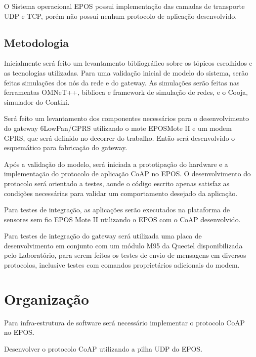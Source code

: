 O Sistema operacional EPOS possui implementa\c{c}\~ao das camadas de transporte UDP e TCP, por\'em n\~ao possui nenhum protocolo de aplica\c{c}\~ao desenvolvido.

\subsection{Metodologia}

Inicialmente ser\'a feito um levantamento bibliogr\'afico sobre os t\'opicos escolhidos e as tecnologias utilizadas. Para uma valida\c{c}\~ao inicial de modelo do sistema, ser\~ao feitas simula\c{c}\~oes dos n\'os da rede e do gateway. As simula\c{c}\~oes ser\~ao feitas nas ferramentas OMNeT++, biblioca e framework de simula\c{c}\~ao de redes, e o Cooja, simulador do Contiki.

Ser\'a feito um levantamento dos componentes necess\'arios para o desenvolvimento do gateway 6LowPan/GPRS utilizando o mote EPOSMote II e um modem GPRS, que ser\'a definido no decorrer do trabalho. Ent\~ao ser\'a desenvolvido o esquem\'atico para fabrica\c{c}\~ao do gateway.

Ap\'os a valida\c{c}\~ao do modelo, ser\'a iniciada a prototipa\c{c}\~ao do hardware e a implementa\c{c}\~ao do protocolo de aplica\c{c}\~ao CoAP no EPOS. O desenvolvimento do protocolo ser\'a orientado a testes, aonde o c\'odigo escrito apenas satisfaz as condi\c{c}\~oes necess\'arias para validar um comportamento desejado da aplica\c{c}\~ao.

Para testes de integra\c{c}\~ao, as aplica\c{c}\~oes ser\~ao executados na plataforma de sensores sem fio EPOS Mote II utilizando o EPOS com o CoAP desenvolvido.

Para testes de integra\c{c}\~ao do gateway ser\'a utilizada uma placa de desenvolvimento em conjunto com um m\'odulo M95 da Quectel disponibilizada pelo Laborat\'orio, para serem feitos os testes de envio de mensagens em diversos protocolos, inclusive testes com comandos propriet\'arios adicionais do modem.


\section{Organiza\c{c}\~ao}

Para infra-estrutura de software ser\'a necess\'ario implementar o protocolo CoAP no EPOS.

Desenvolver o protocolo CoAP utilizando a pilha UDP do EPOS.
